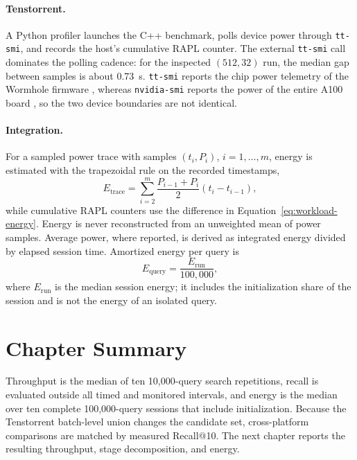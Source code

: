 \paragraph{Tenstorrent.}
A Python profiler launches the C++ benchmark, polls device power through
\texttt{tt-smi}, and records the host's cumulative RAPL counter. The external
\texttt{tt-smi} call dominates the polling cadence: for the inspected
\((512,32)\) run, the median gap between samples is about 0.73~s. \texttt{tt-smi}
reports the chip power telemetry of the Wormhole firmware \cite{tt_smi},
whereas \texttt{nvidia-smi} reports the power of the entire A100 board
\cite{nvidia_smi}, so the two device boundaries are not identical.

\paragraph{Integration.}
For a sampled power trace with samples \((t_i,P_i)\), \(i=1,\ldots,m\), energy is
estimated with the trapezoidal rule on the recorded timestamps,
\begin{equation}
E_{\mathrm{trace}}
=\sum_{i=2}^{m}\frac{P_{i-1}+P_i}{2}\left(t_i-t_{i-1}\right),
\label{eq:tt-host-energy}
\end{equation}
while cumulative RAPL counters use the difference in
Equation~\ref{eq:workload-energy}. Energy is never reconstructed from an
unweighted mean of power samples. Average power, where reported, is derived as
integrated energy divided by elapsed session time. Amortized energy per query
is
\begin{equation}
E_{\mathrm{query}}=\frac{E_{\mathrm{run}}}{100{,}000},
\label{eq:energy-per-query}
\end{equation}
where \(E_{\mathrm{run}}\) is the median session energy; it includes the
initialization share of the session and is not the energy of an isolated query.

\section{Chapter Summary}
\label{sec:methodology-summary}

Throughput is the median of ten 10,000-query search repetitions, recall is
evaluated outside all timed and monitored intervals, and energy is the median
over ten complete 100,000-query sessions that include initialization. Because
the Tenstorrent batch-level union changes the candidate set, cross-platform
comparisons are matched by measured Recall@10. The next chapter reports the
resulting throughput, stage decomposition, and energy.

\cleardoublepage

